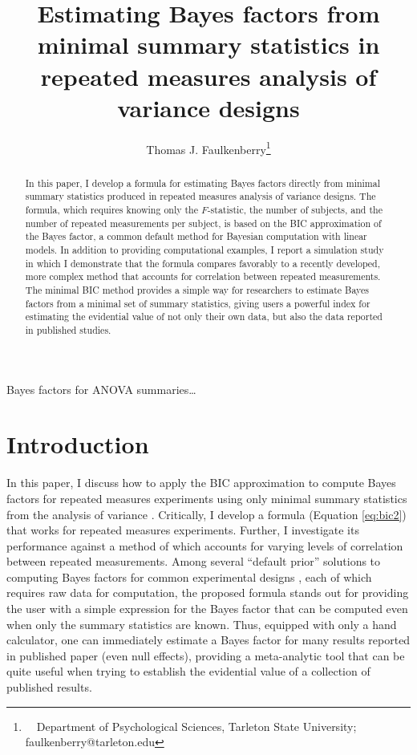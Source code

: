 \documentclass[12pt,twoside,a4paper]{article}
\title{Estimating Bayes factors from minimal summary statistics in repeated measures analysis of variance designs}
\author{
  Thomas J. Faulkenberry\thanks{~~Department of Psychological Sciences, Tarleton State University; faulkenberry@tarleton.edu}
}
\date{ }
\begin{document}
\maketitle

         {Bayes factors for ANOVA summaries\ldots}

\begin{abstract}
\setcounter{footnote}{1}
  In this paper, I develop a formula for estimating Bayes factors directly from minimal summary statistics produced in repeated measures analysis of variance designs. The formula, which requires knowing only the $F$-statistic, the number of subjects, and the number of repeated measurements per subject, is based on the BIC approximation of the Bayes factor, a common default method for Bayesian computation with linear models. In addition to providing computational examples, I report a simulation study in which I demonstrate that the formula compares favorably to a recently developed, more complex method that accounts for correlation between repeated measurements. The minimal BIC method provides a simple way for researchers to estimate Bayes factors from a minimal set of summary statistics, giving users a powerful index for estimating the evidential value of not only their own data, but also the data reported in published studies.
\end{abstract}


\section{Introduction}

In this paper, I discuss how to apply the BIC approximation \citep{kassRaftery1995,wagenmakers2007,masson2011,nathoo2016} to compute Bayes factors for repeated measures experiments using only minimal summary statistics from the analysis of variance \citep[e.g.,][]{ly2018,faulkenberry2018}. Critically, I develop a formula (Equation \ref{eq:bic2}) that works for repeated measures experiments. Further, I investigate its performance against a method of \citet{nathoo2016} which accounts for varying levels of correlation between repeated measurements. Among several ``default prior'' solutions to computing Bayes factors for common experimental designs \citep{rouder2009,rouder2012}, each of which requires raw data for computation, the proposed formula stands out for providing the user with a simple expression for the Bayes factor that can be computed even when only the summary statistics are known. Thus, equipped with only a hand calculator, one can immediately estimate a Bayes factor for many results reported in published paper (even null effects), providing a meta-analytic tool that can be quite useful when trying to establish the evidential value of a collection of published results.
\end{document}
